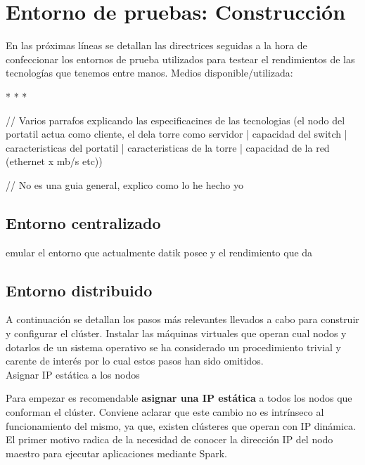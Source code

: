
\pagestyle{fancy}

\chapter{Entorno de pruebas: Construcción}
\label{entorno_pruebas}

En las próximas líneas se detallan las directrices seguidas a la hora de confeccionar los entornos de prueba utilizados para testear el rendimientos de las tecnologías que tenemos entre manos. Medios disponible/utilizada:

*
*
*

// Varios parrafos explicando las especificacines de las tecnologias (el nodo del portatil actua como cliente, el dela torre como servidor | capacidad del switch | caracteristicas del portatil | caracteristicas de la torre | capacidad de la red (ethernet x mb/s etc))

// No es una guia general, explico como lo he hecho yo


\section{Entorno centralizado}

emular el entorno que actualmente datik posee y el rendimiento que da


\section{Entorno distribuido}

A continuación se detallan los pasos más relevantes llevados a cabo para construir y configurar el clúster. Instalar las máquinas virtuales que operan cual nodos y dotarlos de un sistema operativo se ha considerado un procedimiento trivial y carente de interés por lo cual estos pasos han sido omitidos.\\ 

Asignar IP estática a los nodos

Para empezar es recomendable \textbf{asignar una IP estática} a todos los nodos que conforman el clúster. Conviene aclarar que este cambio no es intrínseco al funcionamiento del mismo, ya que, existen clústeres que operan con IP dinámica. El primer motivo radica de la necesidad de conocer la dirección IP del nodo maestro para ejecutar aplicaciones mediante Spark.  

